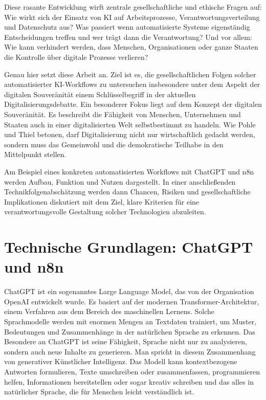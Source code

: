 \documentclass[utf8,biblatex]{bremerhaven_lni}
\begin{document}
Diese rasante Entwicklung wirft zentrale gesellschaftliche und ethische Fragen auf:
Wie wirkt sich der Einsatz von KI auf Arbeitsprozesse, Verantwortungsverteilung und Datenschutz aus?
Was passiert wenn automatisierte Systeme eigenständig Entscheidungen treffen und wer trägt dann die Verantwortung?
Und vor allem: Wie kann verhindert werden, dass Menschen, Organisationen oder ganze Staaten die Kontrolle über digitale Prozesse verlieren?

Genau hier setzt diese Arbeit an. Ziel ist es, die gesellschaftlichen Folgen solcher automatisierter KI-Workflows zu untersuchen insbesondere unter dem Aspekt der digitalen Souveränität einem Schlüsselbegriff in der aktuellen Digitalisierungsdebatte. Ein besonderer Fokus liegt auf dem Konzept der digitalen Souveränität. Es beschreibt die Fähigkeit von Menschen, Unternehmen und Staaten auch in einer digitalisierten Welt selbstbestimmt zu handeln. Wie Pohle und Thiel betonen, darf Digitalisierung nicht nur wirtschaftlich gedacht werden, sondern muss das Gemeinwohl und die demokratische Teilhabe in den Mittelpunkt stellen.

Am Beispiel eines konkreten automatisierten Workflows mit ChatGPT und n8n werden Aufbau, Funktion und Nutzen dargestellt. In einer anschließenden Technikfolgenabschätzung werden dann Chancen, Risiken und gesellschaftliche Implikationen diskutiert mit dem Ziel, klare Kriterien für eine verantwortungsvolle Gestaltung solcher Technologien abzuleiten.


\section{Technische Grundlagen: ChatGPT und n8n}
ChatGPT ist ein sogenanntes Large Language Model, das von der Organisation OpenAI entwickelt wurde. Es basiert auf der modernen Transformer-Architektur, einem Verfahren aus dem Bereich des maschinellen Lernens. Solche Sprachmodelle werden mit enormen Mengen an Textdaten trainiert, um Muster, Bedeutungen und Zusammenhänge in der natürlichen Sprache zu erkennen. Das Besondere an ChatGPT ist seine Fähigkeit, Sprache nicht nur zu analysieren, sondern auch neue Inhalte zu generieren. Man spricht in diesem Zusammenhang von generativer Künstlicher Intelligenz. Das Modell kann kontextbezogene Antworten formulieren, Texte umschreiben oder zusammenfassen, programmieren helfen, Informationen bereitstellen oder sogar kreativ schreiben und das alles in natürlicher Sprache, die für Menschen leicht verständlich ist.
\end{document}
